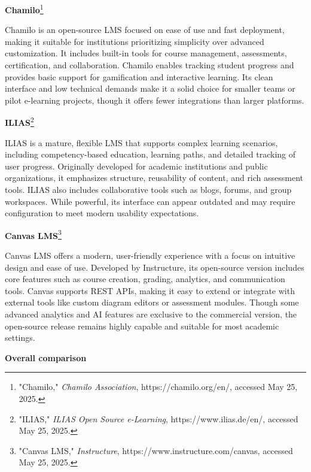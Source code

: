 \textbf{Chamilo}\footnote{"Chamilo," \textit{Chamilo Association}, https://chamilo.org/en/, accessed May 25, 2025.}


Chamilo is an open-source LMS focused on ease of use and fast deployment, making it suitable for institutions prioritizing simplicity over advanced customization. It includes built-in tools for course management, assessments, certification, and collaboration. Chamilo enables tracking student progress and provides basic support for gamification and interactive learning. Its clean interface and low technical demands make it a solid choice for smaller teams or pilot e-learning projects, though it offers fewer integrations than larger platforms.

\textbf{ILIAS}\footnote{"ILIAS," \textit{ILIAS Open Source e-Learning}, https://www.ilias.de/en/, accessed May 25, 2025.}


ILIAS is a mature, flexible LMS that supports complex learning scenarios, including competency-based education, learning paths, and detailed tracking of user progress. Originally developed for academic institutions and public organizations, it emphasizes structure, reusability of content, and rich assessment tools. ILIAS also includes collaborative tools such as blogs, forums, and group workspaces. While powerful, its interface can appear outdated and may require configuration to meet modern usability expectations.

\textbf{Canvas LMS}\footnote{"Canvas LMS," \textit{Instructure}, https://www.instructure.com/canvas, accessed May 25, 2025.}

Canvas LMS offers a modern, user-friendly experience with a focus on intuitive design and ease of use. Developed by Instructure, its open-source version includes core features such as course creation, grading, analytics, and communication tools. Canvas supports REST APIs, making it easy to extend or integrate with external tools like custom diagram editors or assessment modules. Though some advanced analytics and AI features are exclusive to the commercial version, the open-source release remains highly capable and suitable for most academic settings.

\newpage

\textbf{Overall comparison}

